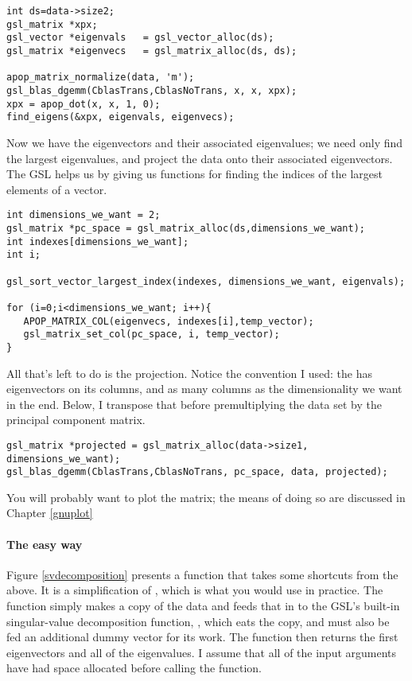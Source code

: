 \begin{lstlisting}
int ds=data->size2;
gsl_matrix *xpx;
gsl_vector *eigenvals   = gsl_vector_alloc(ds);
gsl_matrix *eigenvecs   = gsl_matrix_alloc(ds, ds);

apop_matrix_normalize(data, 'm');
gsl_blas_dgemm(CblasTrans,CblasNoTrans, x, x, xpx);
xpx = apop_dot(x, x, 1, 0);
find_eigens(&xpx, eigenvals, eigenvecs);
\end{lstlisting}

Now we have the eigenvectors and their associated eigenvalues; we need only find
the largest eigenvalues, and project the data onto their associated eigenvectors.
The GSL helps us by giving us functions for
finding the indices of the largest elements of a vector.
\begin{lstlisting}
int dimensions_we_want = 2;
gsl_matrix *pc_space = gsl_matrix_alloc(ds,dimensions_we_want);
int indexes[dimensions_we_want];
int i;

gsl_sort_vector_largest_index(indexes, dimensions_we_want, eigenvals);

for (i=0;i<dimensions_we_want; i++){
   APOP_MATRIX_COL(eigenvecs, indexes[i],temp_vector);
   gsl_matrix_set_col(pc_space, i, temp_vector);
}
\end{lstlisting}

All that's left to do is the projection. Notice the convention I used:
the  has eigenvectors on its columns, and as many columns as the
dimensionality we want in the end. Below, I transpose that before premultiplying
the data set by the principal component matrix.

\begin{lstlisting}
gsl_matrix *projected = gsl_matrix_alloc(data->size1, dimensions_we_want);
gsl_blas_dgemm(CblasTrans,CblasNoTrans, pc_space, data, projected);
\end{lstlisting}

You will probably want to plot the  matrix; the means
of doing so are discussed in Chapter \ref{gnuplot}

\paragraph{The easy way}

Figure \ref{svdecomposition} presents a function that takes some
shortcuts from the above. It is a
simplification of , which is what you would use in practice. The function simply makes
a copy of the data and feeds that in to the GSL's built-in singular-value
decomposition function, , which eats the copy, and must also be fed an
additional dummy vector for its work. The function then returns the first
 eigenvectors and all of the eigenvalues. I
assume that all of the input arguments have had space allocated before
calling the function.  

